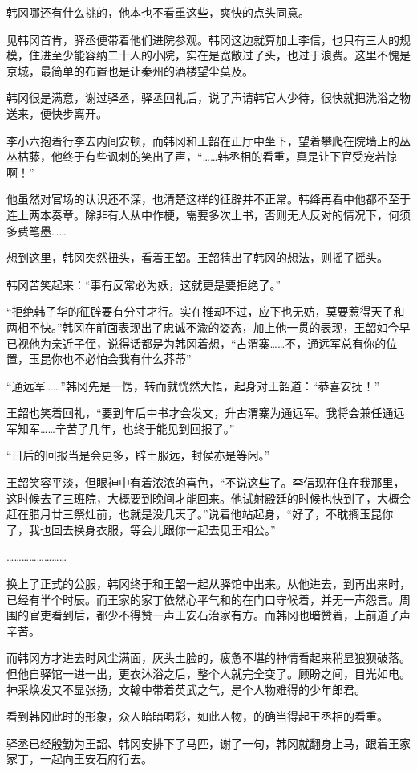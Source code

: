 韩冈哪还有什么挑的，他本也不看重这些，爽快的点头同意。

见韩冈首肯，驿丞便带着他们进院参观。韩冈这边就算加上李信，也只有三人的规模，住进至少能容纳二十人的小院，实在是宽敞过了头，也过于浪费。这里不愧是京城，最简单的布置也是让秦州的酒楼望尘莫及。

韩冈很是满意，谢过驿丞，驿丞回礼后，说了声请韩官人少待，很快就把洗浴之物送来，便快步离开。

李小六抱着行李去内间安顿，而韩冈和王韶在正厅中坐下，望着攀爬在院墙上的丛丛枯藤，他终于有些讽刺的笑出了声，“……韩丞相的看重，真是让下官受宠若惊啊！”

他虽然对官场的认识还不深，也清楚这样的征辟并不正常。韩绛再看中他都不至于连上两本奏章。除非有人从中作梗，需要多次上书，否则无人反对的情况下，何须多费笔墨……

想到这里，韩冈突然扭头，看着王韶。王韶猜出了韩冈的想法，则摇了摇头。

韩冈苦笑起来：“事有反常必为妖，这就更是要拒绝了。”

“拒绝韩子华的征辟要有分寸才行。实在推却不过，应下也无妨，莫要惹得天子和两相不快。”韩冈在前面表现出了忠诚不渝的姿态，加上他一贯的表现，王韶如今早已视他为亲近子侄，说得话都是为韩冈着想，“古渭寨……不，通远军总有你的位置，玉昆你也不必怕会我有什么芥蒂”

“通远军……”韩冈先是一愣，转而就恍然大悟，起身对王韶道：“恭喜安抚！”

王韶也笑着回礼，“要到年后中书才会发文，升古渭寨为通远军。我将会兼任通远军知军……辛苦了几年，也终于能见到回报了。”

“日后的回报当是会更多，辟土服远，封侯亦是等闲。”

王韶笑容平淡，但眼神中有着浓浓的喜色，“不说这些了。李信现在住在我那里，这时候去了三班院，大概要到晚间才能回来。他试射殿廷的时候也快到了，大概会赶在腊月廿三祭灶前，也就是没几天了。”说着他站起身，“好了，不耽搁玉昆你了，我也回去换身衣服，等会儿跟你一起去见王相公。”

……………………

换上了正式的公服，韩冈终于和王韶一起从驿馆中出来。从他进去，到再出来时，已经有半个时辰。而王家的家丁依然心平气和的在门口守候着，并无一声怨言。周围的官吏看到后，都少不得赞一声王安石治家有方。而韩冈也暗赞着，上前道了声辛苦。

而韩冈方才进去时风尘满面，灰头土脸的，疲惫不堪的神情看起来稍显狼狈破落。但他自驿馆一进一出，更衣沐浴之后，整个人就完全变了。顾盼之间，目光如电。神采焕发又不显张扬，文翰中带着英武之气，是个人物难得的少年郎君。

看到韩冈此时的形象，众人暗暗喝彩，如此人物，的确当得起王丞相的看重。

驿丞已经殷勤为王韶、韩冈安排下了马匹，谢了一句，韩冈就翻身上马，跟着王家家丁，一起向王安石府行去。


